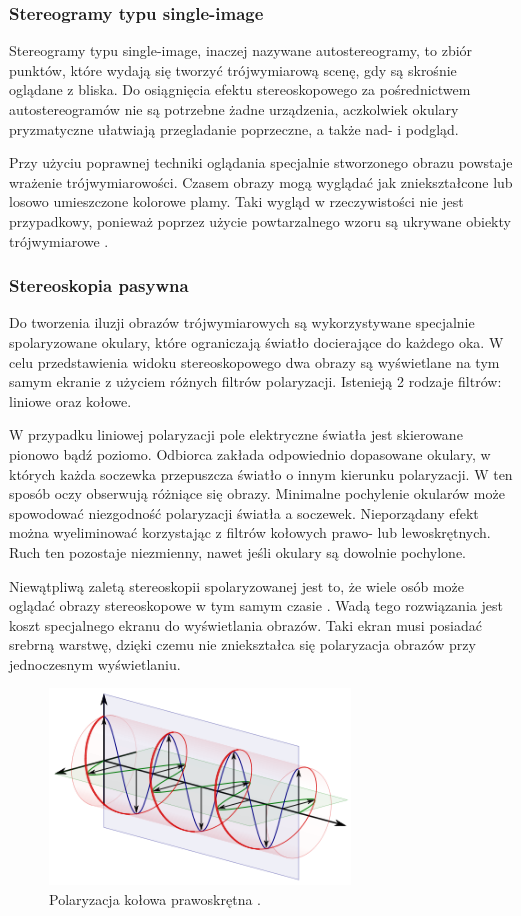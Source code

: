 \subsubsection{Stereogramy typu single-image} 
Stereogramy typu single-image, inaczej nazywane autostereogramy, to zbiór punktów, które wydają się tworzyć trójwymiarową scenę, gdy są skrośnie oglądane z bliska. Do osiągnięcia efektu stereoskopowego za pośrednictwem autostereogramów nie są potrzebne żadne urządzenia, aczkolwiek okulary pryzmatyczne ułatwiają przegladanie poprzeczne, a także nad- i podgląd.

Przy użyciu poprawnej techniki oglądania specjalnie stworzonego obrazu powstaje wrażenie trójwymiarowości. Czasem obrazy mogą wyglądać jak zniekształcone lub losowo umieszczone kolorowe plamy. Taki wygląd w rzeczywistości nie jest przypadkowy, ponieważ poprzez użycie powtarzalnego wzoru są ukrywane obiekty trójwymiarowe \cite{stereoscopythesis}.

\subsubsection{Stereoskopia pasywna} 
Do tworzenia iluzji obrazów trójwymiarowych są wykorzystywane specjalnie spolaryzowane okulary, które ograniczają światło docierające do każdego oka. W celu przedstawienia widoku stereoskopowego dwa obrazy są wyświetlane na tym samym ekranie z użyciem różnych filtrów polaryzacji. Istenieją 2 rodzaje filtrów: liniowe oraz kołowe.

W przypadku liniowej polaryzacji pole elektryczne światła jest skierowane pionowo bądź poziomo. Odbiorca zakłada odpowiednio dopasowane okulary, w których każda soczewka przepuszcza światło o innym kierunku polaryzacji. W ten sposób oczy obserwują różniące się obrazy. Minimalne pochylenie okularów może spowodować niezgodność polaryzacji światła a soczewek. Nieporządany efekt można wyeliminować korzystając z filtrów kołowych prawo- lub lewoskrętnych. Ruch ten pozostaje niezmienny, nawet jeśli okulary są dowolnie pochylone.

Niewątpliwą zaletą stereoskopii spolaryzowanej jest to, że wiele osób może oglądać obrazy stereoskopowe w tym samym czasie \cite{russianpage}. Wadą tego rozwiązania jest koszt specjalnego ekranu do wyświetlania obrazów. Taki ekran musi posiadać srebrną warstwę, dzięki czemu nie zniekształca się polaryzacja obrazów przy jednoczesnym wyświetlaniu.
\begin{figure}[H]
		\centering
 		\includegraphics[width=8cm]{circular.png}
    	\caption{Polaryzacja kołowa prawoskrętna \cite{polarization}.}
 		\label{rys3}
\end{figure}


